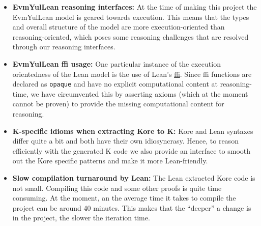\begin{itemize}
\item \textbf{EvmYulLean reasoning interfaces:} At the time of making this project the EvmYulLean model is geared towards execution. This means that the types and overall structure of the model are more execution-oriented than reasoning-oriented, which poses some reasoning challenges that are resolved through our reasoning interfaces.
\item \textbf{EvmYulLean ffi usage:} One particular instance of the execution orientedness of the Lean model is the use of Lean's \href{https://en.wikipedia.org/wiki/Foreign_function_interface}{ffi}. Since ffi functions are declared as \texttt{opaque} and have no explicit computational content at reasoning-time, we have circumvented this by asserting axioms (which at the moment cannot be proven) to provide the missing computational content for reasoning.
\item \textbf{K-specific idioms when extracting Kore to K:} Kore and Lean syntaxes differ quite a bit and both have their own idiosyncrasy. Hence, to reason efficiently with the generated K code we also provide an interface to smooth out the Kore specific patterns and make it more Lean-friendly.
\item \textbf{Slow compilation turnaround by Lean:} The Lean extracted Kore code is not small. Compiling this code and some other proofs is quite time consuming. At the moment, an the average time it takes to compile the project can be around 40 minutes. This makes that the ``deeper'' a change is in the project, the slower the iteration time.
\end{itemize}

